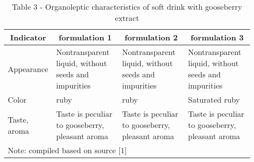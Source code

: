 \begin{table}[H]
  \caption*{Table 3 - Organoleptic characteristics of soft drink with
gooseberry extract}
  \begin{tabular}{|llll|}
  \hline
  \multicolumn{1}{|c|}{Indicator}    & \multicolumn{1}{c|}{formulation 1}                                        & \multicolumn{1}{c|}{formulation 2}                                        & \multicolumn{1}{c|}{formulation 3}                   \\ \hline
  \multicolumn{1}{|l|}{Appearance}   & \multicolumn{1}{l|}{Nontransparent liquid, without seeds  and impurities} & \multicolumn{1}{l|}{Nontransparent liquid, without seeds  and impurities} & Nontransparent liquid, without seeds  and impurities \\ \hline
  \multicolumn{1}{|l|}{Color}        & \multicolumn{1}{l|}{ruby}                                                 & \multicolumn{1}{l|}{ruby}                                                 & Saturated ruby                                       \\ \hline
  \multicolumn{1}{|l|}{Taste, aroma} & \multicolumn{1}{l|}{Taste is peculiar to gooseberry, pleasant aroma}      & \multicolumn{1}{l|}{Taste is peculiar to gooseberry, pleasant aroma}      & Taste is peculiar to gooseberry, pleasant aroma      \\ \hline
  \multicolumn{4}{|l|}{Note: compiled based on source {[}1{]}}                                                                                                                                                                                      \\ \hline
  \end{tabular}
  \end{table}





